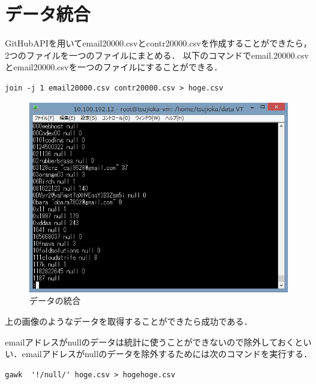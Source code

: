\newpage

\section{データ統合}
GitHubAPIを用いてemail20000.csvとcontr20000.csvを作成することができたら，2つのファイルを一つのファイルにまとめる．
以下のコマンドでemail.20000.csvとemail20000.csvを一つのファイルにすることができる．

\begin{lstlisting}[basicstyle=\ttfamily\footnotesize, frame=single]
join -j 1 email20000.csv contr20000.csv > hoge.csv
\end{lstlisting}

\begin{figure}[htb]
\centering
\includegraphics[width=12cm]{hoge.JPG}
\caption{データの統合}\label{サンプル図}
\end{figure}

上の画像のようなデータを取得することができたら成功である．

\newpage

emailアドレスがnullのデータは統計に使うことができないので除外しておくといい．emailアドレスがnullのデータを除外するためには次のコマンドを実行する．

\begin{lstlisting}[basicstyle=\ttfamily\footnotesize, frame=single]
gawk  '!/null/' hoge.csv > hogehoge.csv
\end{lstlisting}

